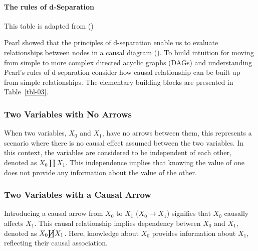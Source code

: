 \documentclass[
  singlecolumn]{article}
\let\oldparagraph\paragraph
\renewcommand{\paragraph}[1]{\oldparagraph{#1}\mbox{}}
\begin{document}
\paragraph{The rules of d-Separation}\label{the-rules-of-d-separation}

\begin{table}

\caption{\label{tbl-03}This table is adapted from
()}

\centering{

\terminologydirectedgraph

}

\end{table}%

Pearl showed that the principles of d-separation enable us to evaluate
relationships between nodes in a causal diagram
(). To build intuition for moving
from simple to more complex directed acyclic graphs (DAGs) and
understanding Pearl's rules of d-separation consider how causal
relationship can be built up from simple relationships. The elementary
building blocks are presented in Table~\ref{tbl-03}.

\subsubsection{Two Variables with No
Arrows}\label{two-variables-with-no-arrows}

When two variables, \(X_0\) and \(X_1\), have no arrows between them,
this represents a scenario where there is no causal effect assumed
between the two variables. In this context, the variables are considered
to be independent of each other, denoted as \(X_0 \coprod X_1\). This
independence implies that knowing the value of one does not provide any
information about the value of the other.

\subsubsection{Two Variables with a Causal
Arrow}\label{two-variables-with-a-causal-arrow}

Introducing a causal arrow from \(X_0\) to \(X_1\)
(\(X_0 \rightarrow X_1\)) signifies that \(X_0\) causally affects
\(X_1\). This causal relationship implies dependency between \(X_0\) and
\(X_1\), denoted as \(X_0 \cancel\coprod X_1\). Here, knowledge about
\(X_0\) provides information about \(X_1\), reflecting their causal
association.
\end{document}
